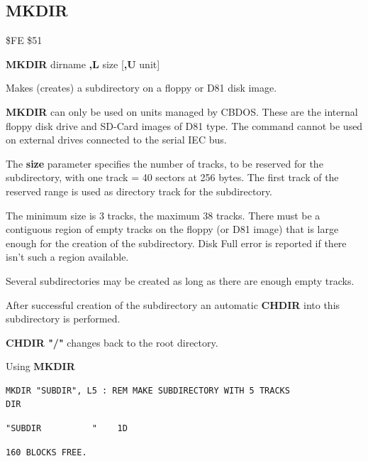 \subsection{MKDIR}
\begin{description}[leftmargin=2cm,style=nextline]
\item [Token:]    \$FE \$51

\item [Format:]   {\bf MKDIR} dirname {\bf,L} size [{\bf,U} unit]

\item [Usage:]    Makes (creates) a subdirectory on a floppy or D81 disk image.

                  \dirnamedefinition

                  {\bf MKDIR} can only be used on units managed by CBDOS. These are the internal floppy disk drive and SD-Card images of D81 type. The command cannot be used on external drives connected to the serial IEC bus.

                  The {\bf size} parameter specifies the number of tracks, to be reserved for the subdirectory, with one track = 40 sectors at 256 bytes. The first track of the reserved range is used as directory track for the subdirectory.

                  The minimum size is 3 tracks, the maximum 38 tracks. There must be a contiguous region of empty tracks on the floppy (or D81 image) that is large enough for the creation of the subdirectory. Disk Full error is reported if there isn't such a region available.

                  Several subdirectories may be created as long as there are enough empty tracks.

                  After successful creation of the subdirectory an automatic {\bf CHDIR} into this subdirectory is performed.

                  {\bf CHDIR "/"} changes back to the root directory.

\item [Example:]  Using {\bf MKDIR}

\begin{tcolorbox}[colback=black,coltext=white]
\verbatimfont{\codefont}
\begin{verbatim}
MKDIR "SUBDIR", L5 : REM MAKE SUBDIRECTORY WITH 5 TRACKS
DIR
\end{verbatim}
\selectfont{\codefont 0}
\begin{tcolorbox}[colback=white,coltext=black,arc=0mm,boxrule=0mm,
       left*=0.5mm,right*=0mm,top=0mm,bottom=0mm,nobeforeafter,
       left skip=0.5mm,
       width=28mm,height=3mm,valign=center]
\begin{verbatim}
"SUBDIR          "    1D
\end{verbatim}
\end{tcolorbox}
\begin{verbatim}
160 BLOCKS FREE.
\end{verbatim}
\end{tcolorbox}
\end{description}

